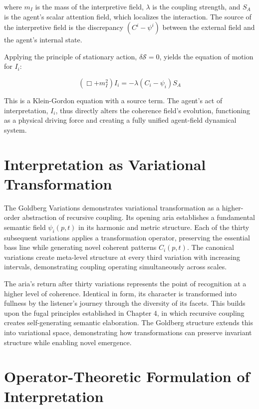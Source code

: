 where \(m_I\) is the mass of the interpretive field, \(\lambda\) is the coupling strength, and \(S_A\) is the agent's scalar attention field, which localizes the interaction. The source of the interpretive field is the discrepancy \((C^i - \psi^i)\) between the external field and the agent's internal state.

Applying the principle of stationary action, \(\delta \mathcal{S} = 0\), yields the equation of motion for \(I_i\):

\begin{equation}
(\Box + m_I^2) I_i = -\lambda (C_i - \psi_i) S_A
\end{equation}

This is a Klein-Gordon equation with a source term. The agent's act of interpretation, \(I_i\), thus directly alters the coherence field's evolution, functioning as a physical driving force and creating a fully unified agent-field dynamical system.

\section{Interpretation as Variational Transformation}

The Goldberg Variations \autocite{Bach1741} demonstrates variational transformation as a higher-order abstraction of recursive coupling. Its opening aria establishes a fundamental semantic field \(\psi_i(p,t)\) in its harmonic and metric structure. Each of the thirty subsequent variations applies a transformation operator, preserving the essential bass line while generating novel coherent patterns \(C_i(p,t)\). The canonical variations create meta-level structure at every third variation with increasing intervals, demonstrating coupling operating simultaneously across scales.

The aria's return after thirty variations represents the point of recognition at a higher level of coherence. Identical in form, its character is transformed into fullness by the listener's journey through the diversity of its facets. This builds upon the fugal principles established in Chapter 4, in which recursive coupling creates self-generating semantic elaboration. The Goldberg structure extends this into variational space, demonstrating how transformations can preserve invariant structure while enabling novel emergence.

\section{Operator-Theoretic Formulation of Interpretation}\label{sec:interpretation_operator}

